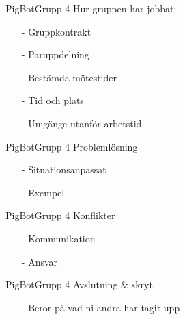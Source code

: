 \begin{frame}[fragile]{PigBot}{Grupp 4}
Hur gruppen har jobbat:
  \begin{itemize}
 \pause
    \item[-] Gruppkontrakt 
\pause
    \item[-] Paruppdelning
\pause
    \item[-] Bestämda mötestider
\pause
    \item[-] Tid och plats
\pause
    \item[-] Umgänge utanför arbetstid
  \end{itemize}
\end{frame}

\begin{frame}[fragile]{PigBot}{Grupp 4}
Problemlösning
  \begin{itemize}
 \pause
    \item[-] Situationsanpassat
\pause
    \item[-] Exempel
  \end{itemize}
\end{frame}

\begin{frame}[fragile]{PigBot}{Grupp 4}
Konflikter
  \begin{itemize}
 \pause
    \item[-] Kommunikation
\pause
    \item[-] Ansvar
  \end{itemize}
\end{frame}

\begin{frame}[fragile]{PigBot}{Grupp 4}
Avslutning \& skryt
  \begin{itemize}
 \pause
    \item[-] Beror på vad ni andra har tagit upp
  \end{itemize}
\end{frame}


